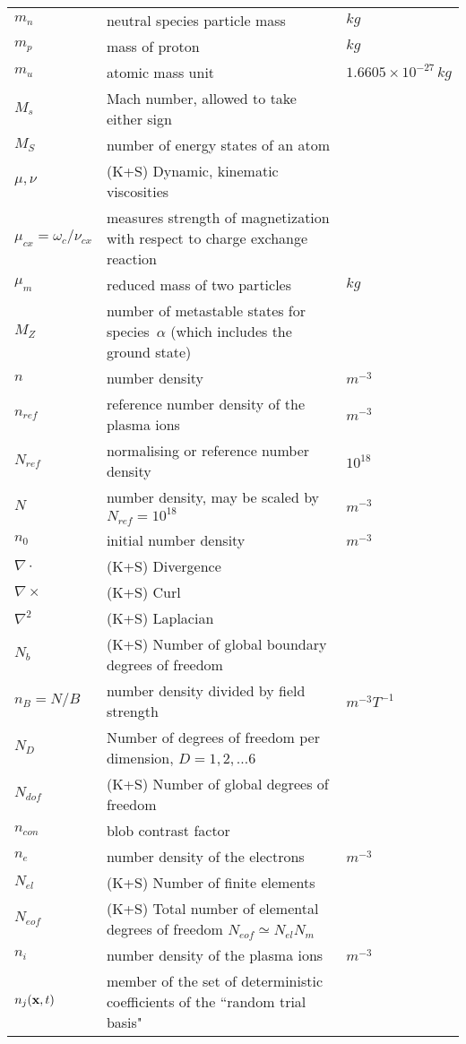 \begin{longtable}{|p{3.0cm}|p{10.0cm}|p{3.0cm}|}
$m_n$ & neutral species particle mass & $kg$ \\
$m_p$ & mass of proton & $kg$ \\
$m_u$ & atomic mass unit & $1.6605 \times 10^{-27}\,kg$ \\
$M_s$ & Mach number, allowed to take either sign & \\
$M_S$ & number of energy states of an atom & \\
$\mu, \nu$ &  (K+S) Dynamic, kinematic viscosities & \\
$\mu_{cx}=\omega_c/\nu_{cx}$ & measures strength of magnetization with respect to charge exchange reaction & \\
$\mu_m$ & reduced mass of two particles & $kg$ \\
$M_Z$ & number of metastable states for species~$\alpha$ (which includes the ground state) & \\
$n$ & number density & $m^{-3}$ \\
$n_{ref}$ & reference number density of the plasma ions & $m^{-3}$ \\
$N_{ref} $ & normalising or reference number density & $10^{18}$  \\
$N$ & number density, may be scaled by $N_{ref}=10^{18}$ & $m^{-3}$ \\
$n_0$ & initial number density & $m^{-3}$ \\
$\nabla \cdot$ &  (K+S) Divergence & \\
$\nabla \times$ &  (K+S) Curl & \\
$\nabla^2$ &  (K+S) Laplacian & \\
$N_{b}$ &  (K+S) Number of global boundary degrees of freedom & \\
$n_B=N/B$ & number density divided by field strength & $m^{-3}T^{-1}$ \\
$N_D$ &  Number of degrees of freedom per dimension, $D=1,2,\ldots6$ & \\
$N_{dof}$ &  (K+S) Number of global degrees of freedom & \\
$n_{con}$ & blob contrast factor  &  \\
$n_e$ & number density of the electrons & $m^{-3}$ \\
$N_{el}$ &  (K+S) Number of finite elements & \\
$N_{eof}$ &  (K+S) Total number of elemental degrees of freedom $N_{eof} \simeq N_{el}N_m$ & \\
$n_i$ & number density of the plasma ions & $m^{-3}$ \\
$n_j({\bf x},t)$ & member of the set of deterministic coefficients of the ``random trial basis" & \\

\end{longtable}
